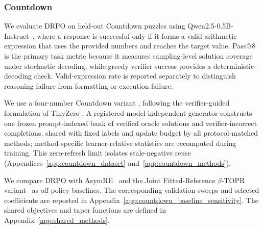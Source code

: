 \documentclass[sigconf,anonymous,review]{acmart}
\theoremstyle{acmdefinition}
\begin{document}
\subsubsection{Countdown}
\label{sec:countdown_performance}

We evaluate DRPO on held-out Countdown puzzles using
Qwen2.5-0.5B-Instruct~\citep{qwen2024qwen25}, where a response is
successful only if it forms a valid arithmetic expression that uses the
provided numbers and reaches the target value. Pass@8 is the primary task metric because it measures
sampling-level solution coverage under stochastic decoding, while
greedy verifier success provides a deterministic-decoding check.
Valid-expression rate is reported separately to distinguish reasoning
failure from formatting or execution failure.

We use a four-number Countdown variant \citep{hutton2002countdown}, following
the verifier-guided formulation of TinyZero \citep{pan2025tinyzero}. A
registered model-independent generator constructs one frozen prompt-indexed
bank of verified oracle solutions and verifier-incorrect completions, shared
with fixed labels and update budget by all protocol-matched methods;
method-specific learner-relative statistics are recomputed during training.
This zero-refresh limit isolates stale-negative reuse
(Appendices~\ref{app:countdown_dataset} and~\ref{app:countdown_methods}).

We compare DRPO with
AsymRE~\citep{arnal2025asymmetric} and
the Joint Fitted-Reference \(\beta\)-TOPR
variant~\citep{leroux2025tapered} as off-policy baselines.
The corresponding validation sweeps and selected coefficients are
reported in Appendix~\ref{app:countdown_baseline_sensitivity}.
The shared objectives and taper functions are defined in
Appendix~\ref{app:shared_methods}.
\end{document}
